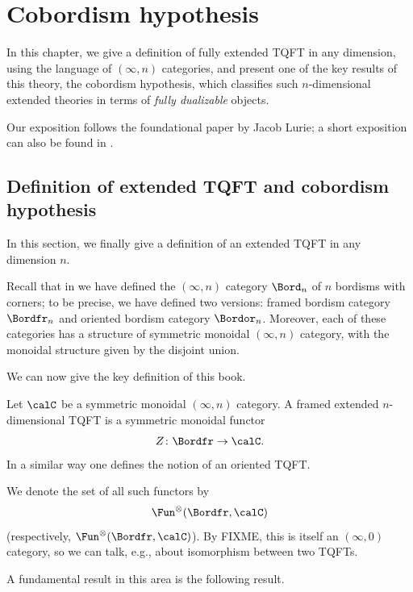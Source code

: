 \chapter{Cobordism hypothesis}\label{c:cob-hyp}

In this chapter, we give a definition of fully extended TQFT in
any dimension, using the language of $(\infty,n)$ categories, and
present one of the key results of this theory, the cobordism hypothesis,
which classifies such $n$-dimensional extended theories in terms of
\emph{fully dualizable} objects.

Our exposition follows the foundational paper
\cite{lurie-cobordism} by Jacob Lurie; a short exposition can also be
found in \cite{freed-cobordism}.

\section{Definition of extended TQFT and cobordism hypothesis}\label{s:cobordism-hypothesis}
In this section, we finally give a definition of an extended TQFT in any
dimension $n$.

Recall that in  we have defined the $(\infty,n)$
category $\Bord_n$ of $n$ bordisms with corners; to be precise, we have defined
two versions: framed bordism category $\Bordfr_n$ and oriented bordism category
$\Bordor_n$. Moreover, each of these categories has a structure of symmetric
monoidal $(\infty,n)$ category, with the monoidal structure given by the
disjoint union.

We can now give the key definition of this book.

\begin{definition}\label{d:xtqft-infty}
  Let $\calC$ be a symmetric monoidal $(\infty, n)$ category. A framed extended
  $n$-dimensional TQFT is a symmetric monoidal functor
  $$
    Z\colon \Bordfr \to \calC.
  $$
  In a similar way one defines the notion of an oriented TQFT.
\end{definition}

We denote the set of all such functors by
$$
  \Fun^{\otimes}(\Bordfr, \calC)
$$
(respectively,   $\Fun^{\otimes}(\Bordfr, \calC)$). By FIXME, this is itself an
$(\infty, 0)$ category, so we can talk, e.g.,  about isomorphism between two
TQFTs.


A fundamental result in this area is the following result.


